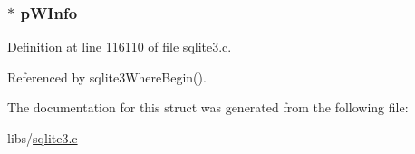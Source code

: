 \subsubsection[{p\+W\+Info}]{$\ast$ p\+W\+Info}\label{struct_where_loop_builder_a831ff4750d43c35052a460caacac1bac}


Definition at line 116110 of file sqlite3.\+c.



Referenced by sqlite3\+Where\+Begin().



The documentation for this struct was generated from the following file\+:\begin{DoxyCompactItemize}
\item 
libs/\hyperlink{sqlite3_8c}{sqlite3.\+c}\end{DoxyCompactItemize}
